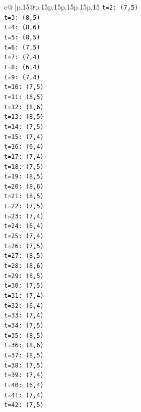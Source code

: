 \documentclass{article}
\begin{document}
{\begin{supertabular}{c@{$\;$}|p{.15\linewidth}@{}p{.15\linewidth}p{.15\linewidth}p{.15\linewidth}p{.15\linewidth}p{.15\linewidth}}
{{{\texttt{t=2: (7,5)} \\
\texttt{t=3: (8,5)} \\
\texttt{t=4: (8,6)} \\
\texttt{t=5: (8,5)} \\
\texttt{t=6: (7,5)} \\
\texttt{t=7: (7,4)} \\
\texttt{t=8: (6,4)} \\
\texttt{t=9: (7,4)} \\
\texttt{t=10: (7,5)} \\
\texttt{t=11: (8,5)} \\
\texttt{t=12: (8,6)} \\
\texttt{t=13: (8,5)} \\
\texttt{t=14: (7,5)} \\
\texttt{t=15: (7,4)} \\
\texttt{t=16: (6,4)} \\
\texttt{t=17: (7,4)} \\
\texttt{t=18: (7,5)} \\
\texttt{t=19: (8,5)} \\
\texttt{t=20: (8,6)} \\
\texttt{t=21: (8,5)} \\
\texttt{t=22: (7,5)} \\
\texttt{t=23: (7,4)} \\
\texttt{t=24: (6,4)} \\
\texttt{t=25: (7,4)} \\
\texttt{t=26: (7,5)} \\
\texttt{t=27: (8,5)} \\
\texttt{t=28: (8,6)} \\
\texttt{t=29: (8,5)} \\
\texttt{t=30: (7,5)} \\
\texttt{t=31: (7,4)} \\
\texttt{t=32: (6,4)} \\
\texttt{t=33: (7,4)} \\
\texttt{t=34: (7,5)} \\
\texttt{t=35: (8,5)} \\
\texttt{t=36: (8,6)} \\
\texttt{t=37: (8,5)} \\
\texttt{t=38: (7,5)} \\
\texttt{t=39: (7,4)} \\
\texttt{t=40: (6,4)} \\
\texttt{t=41: (7,4)} \\
\texttt{t=42: (7,5)} \\
}}}
\end{supertabular}}
\end{document}
